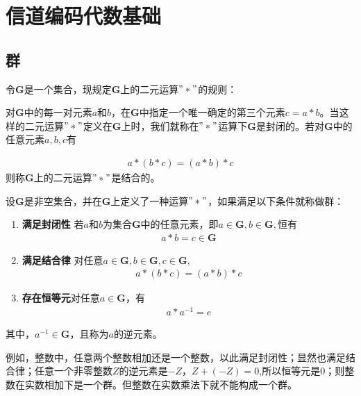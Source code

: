 %
\chapter{信道编码代数基础}
\thispagestyle{empty}

\section{群\cite{JINSHIDAISHU}}
令$\mathbf{G}$是一个集合，现规定$\mathbf{G}$上的二元运算$"*"$的规则：

对$\mathbf{G}$中的每一对元素$a$和$b$，在$\mathbf{G}$中指定一个唯一确定的第三个元素$c=a*b$。当这样的二元运算$"*"$定义在$\mathbf{G}$上时，我们就称在$"*"$运算下$\mathbf{G}$是封闭的。若对$\mathbf{G}$中的任意元素$a,b,c$有

\begin{eqnarray}
  a*(b*c)=(a*b)*c  
  \label{equ:2.1}
\end{eqnarray}
则称$\mathbf{G}$上的二元运算$"*"$是结合的。

\begin{ioadefine}
  设$\mathbf{G}$是非空集合，并在$\mathbf{G}$上定义了一种运算$"*"$，如果满足以下条件就称做群：
  \begin{enumerate}
    \item \textbf{满足封闭性}\quad
      若$a$和$b$为集合$\mathbf{G}$中的任意元素，即$a\in\mathbf{G},b\in\mathbf{G},$恒有
      \begin{eqnarray}
        a*b=c\in\mathbf{G}
        \label{equ:2.2}
      \end{eqnarray}
    \item \textbf{满足结合律}\quad
      对任意$a\in\mathbf{G},b\in\mathbf{G},c\in\mathbf{G},$
      \begin{eqnarray}
     a*(b*c)=(a*b)*c    
        \label{equ:2.3}
      \end{eqnarray}
    \item \textbf{存在恒等元}\quad 对任意$a\in\mathbf{G}$，有
      \begin{eqnarray}
        a*a^{-1}=e
        \label{equ:2.4}
      \end{eqnarray}
  \end{enumerate}
  其中，$a^{-1}\in\mathbf{G}$，且称为$a$的逆元素。  
\end{ioadefine}
例如，整数中，任意两个整数相加还是一个整数，以此满足封闭性；显然也满足结合律；任意一个非零整数$Z$的逆元素是$-Z$，$Z+(-Z)=0$,所以恒等元是0；则整数在实数相加下是一个群。但整数在实数乘法下就不能构成一个群。


